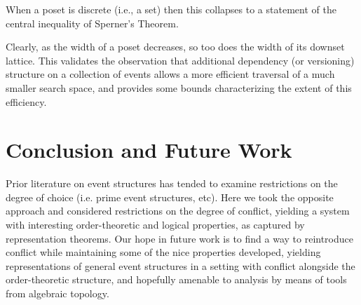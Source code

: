 \documentclass[a4paper,USenglish,cleveref, autoref, thm-restate,authorcolumns]{lipics-v2019}
\begin{document}
When a poset is discrete (i.e., a set) then this collapses to a statement of the central inequality of Sperner's Theorem.

Clearly, as the width of a poset decreases, so too does the width of its downset lattice. This validates the observation that additional dependency (or versioning) structure on a collection of events allows a more efficient traversal of a much smaller search space, and provides some bounds characterizing the extent of this efficiency.

\section{Conclusion and Future  Work}
Prior literature on event structures has tended to examine restrictions on the degree of choice (i.e. prime event structures, etc). Here we took the opposite approach and considered restrictions on the degree of conflict, yielding a system with interesting order-theoretic and logical properties, as captured by representation theorems. Our hope in future work is to find a way to reintroduce conflict while maintaining some of the nice properties developed, yielding representations of general event structures in a setting with conflict alongside the order-theoretic structure, and hopefully amenable  to analysis by means of tools from algebraic topology.




\end{document}
